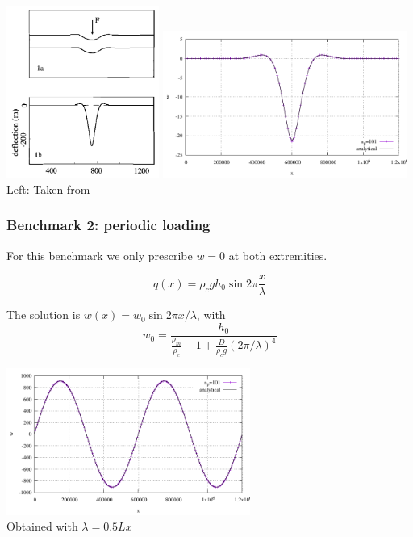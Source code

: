 \begin{center}
\includegraphics[width=5cm]{python_codes/fieldstone_105/images/buiter}
\includegraphics[width=8cm]{python_codes/fieldstone_105/results/bench1/w.pdf}\\
{\captionfont Left: Taken from \cite{buiter_thesis}}
\end{center}


\subsubsection*{Benchmark 2: periodic loading}

For this benchmark we only prescribe $w=0$ at both extremities.

\[
q(x)=\rho_c g h_0 \sin 2\pi \frac{x}{\lambda}
\]

The solution is $w(x)=w_0 \sin 2\pi x/\lambda$, with 
\[
w_0=\frac{h_0}{\frac{\rho_m}{\rho_c}-1+\frac{D}{\rho_c g} (2\pi/\lambda)^4}
\]

\begin{center}
\includegraphics[width=8cm]{python_codes/fieldstone_105/results/bench2/w.pdf}\\
{\captionfont Obtained with $\lambda=0.5Lx$}
\end{center}


